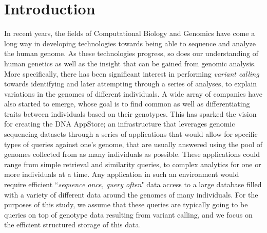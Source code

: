 \documentclass[conference,twocolumn,10pt]{IEEEtran}
\begin{document}
\section{Introduction}
In recent years, the fields of Computational Biology and Genomics have come a long way in developing technologies towards being able to sequence and analyze the human genome. As these technologies progress, so does our understanding of human genetics as well as the insight that can be gained from genomic analysis. More specifically, there has been significant interest in performing \textit{variant calling} towards identifying and later attempting through a series of analyses, to explain variations in the genomes of different individuals. A wide array of companies have also started to emerge, whose goal is to find common as well as differentiating traits between individuals based on their genotypes. This has sparked the vision for creating the DNA AppStore; an infrastructure that leverages genomic sequencing datasets through a series of applications that would allow for specific types of queries against one's genome, that are usually answered using the pool of genomes collected from as many individuals as possible. These applications could range from simple retrieval and similarity queries, to complex analytics for one or more individuals at a time. Any application in such an environment would require efficient ``\textit{sequence once, query often}" data access to a large database filled with a variety of different data around the genomes of many individuals. For the purposes of this study, we assume that these queries are typically going to be queries on top of genotype data resulting from variant calling, and we focus on the efficient structured storage of this data.
\end{document}
